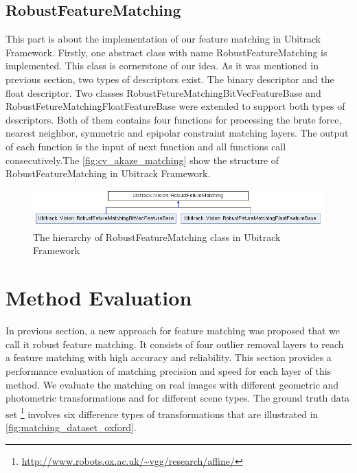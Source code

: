\subsection {RobustFeatureMatching} \label{subsec:robust_feature_matching}
This part is about the implementation of our feature matching in Ubitrack Framework. Firstly, one abstract class with name RobustFeatureMatching is implemented. This class is cornerstone of our idea. As it was mentioned in previous section, two types of descriptors exist. The binary descriptor and the float descriptor. Two classes RobustFetureMatchingBitVecFeatureBase and RobustFetureMatchingFloatFeatureBase were extended to support both types of descriptors. Both of them contains four functions for processing the brute force, nearest neighbor, symmetric and epipolar constraint matching layers. The output of each function is the input of next function and all functions call consecutively.The \autoref{fig:cv_akaze_matching} show the structure of RobustFeatureMatching in Ubitrack Framework.

\begin{figure}[H]
  \centering
  \includegraphics[width=140mm]{figures/robust_feature_matching}
  \caption{The hierarchy of RobustFeatureMatching class in Ubitrack Framework}\label{fig:cv_akaze_matching}
\end{figure}


\section {Method Evaluation}
In previous section, a new approach for feature matching was proposed that we call it robust feature matching. It consists of four outlier removal layers to reach a feature matching with high accuracy and reliability. This section provides a performance evaluation of matching precision and speed for each layer of this method. We evaluate the matching on real images with different geometric and photometric transformations and for different scene types. The ground truth data set \footnote {\url{http://www.robots.ox.ac.uk/~vgg/research/affine/}} involves six difference types of transformations that are illustrated in \autoref{fig:matching_dataset_oxford}.

